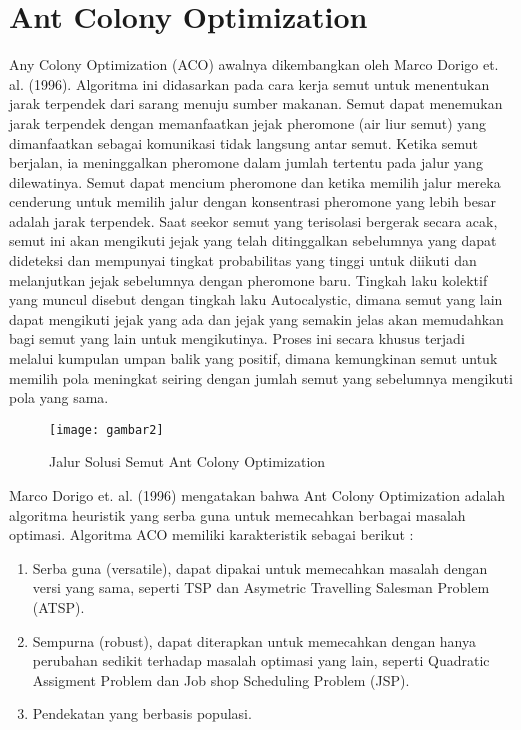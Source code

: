 \section{Ant Colony Optimization}
Any Colony Optimization (ACO) awalnya dikembangkan oleh Marco Dorigo et. al. (1996). Algoritma ini didasarkan pada cara kerja semut untuk menentukan jarak terpendek dari sarang menuju sumber makanan. Semut dapat menemukan jarak terpendek dengan memanfaatkan jejak pheromone (air liur semut) yang dimanfaatkan sebagai komunikasi tidak langsung antar semut. Ketika semut berjalan, ia meninggalkan pheromone dalam jumlah tertentu pada jalur yang dilewatinya. Semut dapat mencium pheromone dan ketika memilih jalur mereka cenderung untuk memilih jalur dengan konsentrasi pheromone yang lebih besar adalah jarak terpendek.
Saat seekor semut yang terisolasi bergerak secara acak, semut ini akan mengikuti jejak yang telah ditinggalkan sebelumnya yang dapat dideteksi dan mempunyai tingkat probabilitas yang tinggi untuk diikuti dan melanjutkan jejak sebelumnya dengan pheromone baru. Tingkah laku kolektif yang muncul disebut dengan tingkah laku Autocalystic, dimana semut yang lain dapat mengikuti jejak yang ada dan jejak yang semakin jelas akan memudahkan bagi semut yang lain untuk mengikutinya. Proses ini secara khusus terjadi melalui kumpulan umpan balik yang positif, dimana kemungkinan semut untuk memilih pola meningkat seiring dengan jumlah semut yang sebelumnya mengikuti pola yang sama.
\begin{figure}[H]
	\centering
	\texttt{[image: gambar2]}
	\caption[Jalur Solusi Semut] {Jalur Solusi Semut Ant Colony Optimization}
	\label{fig:JaluSolusiSemut}
\end{figure}
Marco Dorigo et. al. (1996) mengatakan bahwa Ant Colony Optimization adalah algoritma heuristik yang serba guna untuk memecahkan berbagai masalah optimasi. Algoritma ACO memiliki karakteristik sebagai berikut :
\begin{enumerate}
	\item Serba guna (versatile), dapat dipakai untuk memecahkan masalah dengan versi yang sama, seperti TSP dan Asymetric Travelling Salesman Problem (ATSP).
	\item Sempurna (robust), dapat diterapkan untuk memecahkan dengan hanya perubahan sedikit terhadap masalah optimasi yang lain, seperti Quadratic Assigment Problem dan Job shop Scheduling Problem (JSP).
	\item Pendekatan yang berbasis populasi.
\end{enumerate}

